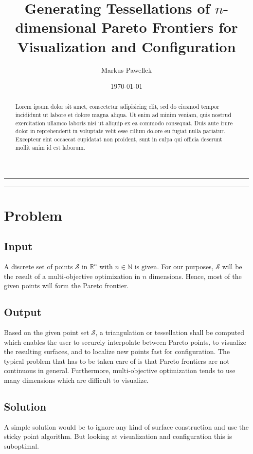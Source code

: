\documentclass[10pt, twoside]{article}
\title{Generating Tessellations of $n$-dimensional Pareto Frontiers for Visualization and Configuration}
\author{Markus Pawellek}
\date{\today}
\newcommand{\naturalnumbers}{\mathds{N}}
\newcommand{\realnumbers}{\mathds{R}}
\begin{document}
  \maketitle

  \bigskip
  \hrule
  \smallskip
  \begin{abstract}
    Lorem ipsum dolor sit amet, consectetur adipisicing elit, sed do eiusmod
    tempor incididunt ut labore et dolore magna aliqua. Ut enim ad minim veniam,
    quis nostrud exercitation ullamco laboris nisi ut aliquip ex ea commodo
    consequat. Duis aute irure dolor in reprehenderit in voluptate velit esse
    cillum dolore eu fugiat nulla pariatur. Excepteur sint occaecat cupidatat non
    proident, sunt in culpa qui officia deserunt mollit anim id est laborum.
  \end{abstract}
  \medskip
  \hrule
  \bigskip

  \tableofcontents
  \cleardoublepage

  \section{Problem} %
  \label{sec:problem}
    \subsection{Input} %
    \label{sub:input}
      A discrete set of points $\mathcal{S}$ in $\realnumbers^n$ with $n\in\naturalnumbers$ is given.
      For our purposes, $\mathcal{S}$ will be the result of a multi-objective optimization in $n$ dimensions.
      Hence, most of the given points will form the Pareto frontier.

    \subsection{Output} %
    \label{sub:output}
      Based on the given point set $\mathcal{S}$, a triangulation or tessellation shall be computed which enables the user to securely interpolate between Pareto points, to visualize the resulting surfaces, and to localize new points fast for configuration.
      The typical problem that has to be taken care of is that Pareto frontiers are not continuous in general.
      Furthermore, multi-objective optimization tends to use many dimensions which are difficult to visualize.

    \subsection{Solution} %
    \label{sub:solution}
      A simple solution would be to ignore any kind of surface construction and use the sticky point algorithm.
      But looking at visualization and configuration this is suboptimal.
\end{document}

